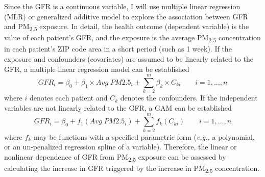 \documentclass[11pt]{article}
\newcommand{\tsub}{\textsubscript}
\begin{document}
\begin{enumerate*}[{[a)]}]
    \item Since the GFR is a continuous variable, I will use multiple linear regression (MLR) or generalized additive model to explore the association between GFR and PM\tsub{2.5} exposure. In detail, the health outcome (dependent variable) is the value of each patient's GFR, and the exposure is the average PM\tsub{2.5} concentration in each patient's ZIP code area in a short period (such as 1 week). If the exposure and confounders (covariates) are assumed to be linearly related to the GFR, a multiple linear regression model can be established
    \begin{equation*}
        GFR_i = \beta_0 + \beta_1 \times Avg\;PM2.5_i + \sum_{k=2}^m\beta_k\times C_{ki} \qquad i = 1,\ldots, n
    \end{equation*}
    where $i$ denotes each patient and $C_{k}$ denotes the confounders. If the independent variables are not linearly related to the GFR, a GAM can be established
    \begin{equation*}
        GFR_i = \beta_0 + f_1(Avg\;PM2.5_i) + \sum_{k=2}^mf_k(C_{ki}) \qquad i = 1,\ldots, n
    \end{equation*}
    where $f_k$ may be functions with a specified parametric form (\textit{e.g.,} a polynomial, or an un-penalized regression spline of a variable). Therefore, the linear or nonlinear dependence of GFR from PM\tsub{2.5} exposure can be assessed by calculating the increase in GFR triggered by the increase in PM\tsub{2.5} concentration.
\end{enumerate*}
\end{document}
